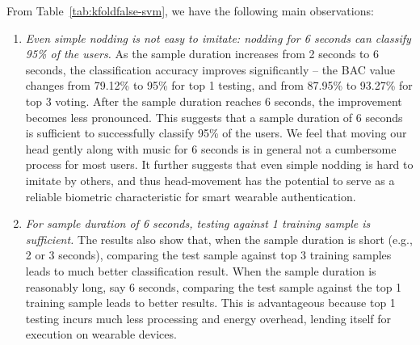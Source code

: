From Table~\ref{tab:kfoldfalse-svm}, we have the following main observations:
\fi

\begin{enumerate}
\item \emph{Even simple nodding is not easy to imitate: nodding for 6 seconds 
can classify 95\% of the users.} As the sample duration increases from 2 
seconds to 6 seconds, the classification accuracy improves significantly -- 
the BAC value changes from 79.12\% to 95\% for top 1 testing, and from 87.95\% 
to 93.27\% for top 3 voting. After the sample duration reaches 6 seconds, the 
improvement becomes less pronounced. This suggests that a sample duration of 6 
seconds is sufficient to successfully classify 95\% of the users. We feel that 
moving our head gently along with music for 6 seconds is in general not a 
cumbersome process for most users. It further suggests that even simple 
nodding is hard to imitate by others, and thus head-movement has the potential 
to serve as a reliable biometric characteristic for smart wearable 
authentication.


\item \emph{For sample duration of 6 seconds, testing against 1 training 
sample is sufficient.} The results also show that, when the sample duration is 
short (e.g., 2 or 3 seconds), comparing the test sample against top 3 training 
samples leads to much better classification result. When the sample duration 
is reasonably long, say 6 seconds, comparing the test sample against the top 1 
training sample leads to better results. This is advantageous because top 1 
testing incurs much less processing and energy overhead, lending itself for 
execution on wearable devices.
\end{enumerate}

